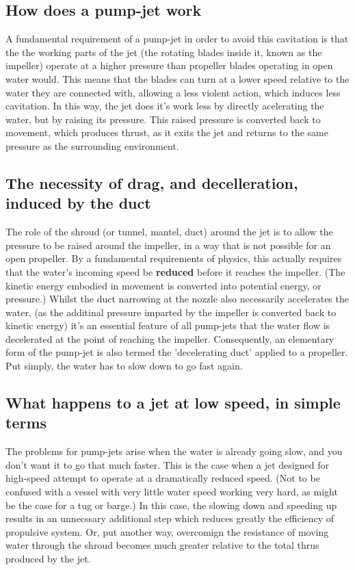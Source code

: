 \documentclass{article}\usepackage[]{graphicx}\usepackage[]{color}
\begin{document}
\subsection{How does a pump-jet work}
A fundamental requirement of a pump-jet in order to avoid this cavitation is that the the working parts of the jet (the rotating blades inside it, known as the impeller) operate at a higher pressure than propeller blades operating in open water would.  This means that the blades can turn at a lower speed relative to the water they are connected with, allowing a less violent action, which induces less cavitation.  In this way, the jet does it's work less by directly acelerating the water, but by raising its pressure.  This raised pressure is converted back to movement, which produces thrust, as it exits the jet and returns to the same pressure as the surrounding environment.

\subsection{The necessity of drag, and decelleration, induced by the duct}
The role of the shroud (or tunnel, mantel, duct) around the jet is to allow the pressure to be raised around the impeller, in a way that is not possible for an open propeller.  By a fundamental requirements of physics, this actually requires that the water's incoming speed be \textbf{reduced} before it reaches the impeller. (The kinetic energy embodied in movement is converted into potential energy, or pressure.)  Whilst the duct narrowing at the nozzle also necessarily accelerates the water, (as the additinal pressure imparted by the impeller is converted back to kinetic energy) it's an essential feature of all pump-jets that the water flow is decelerated at the point of reaching the impeller. Consequently, an elementary form of the pump-jet is also termed the 'decelerating duct' applied to a propeller.  Put simply, the water has to slow down to go fast again.

\subsection{What happens to a jet at low speed, in simple terms}
The problems for pump-jets arise when the water is already going slow, and you don't want it to go that much faster.  This is the case when a jet designed for high-speed attempt to operate at a dramatically reduced speed.  (Not to be confused with a vessel with very little water speed working very hard, as might be the case for a tug or barge.)  In this case, the slowing down and speeding up results in an unnecssary additional step which reduces greatly the efficiency of propulsive system. Or, put another way, overcomign the resistance of moving water through the shroud becomes much greater relative to the total thrus produced by the jet.
\end{document}

